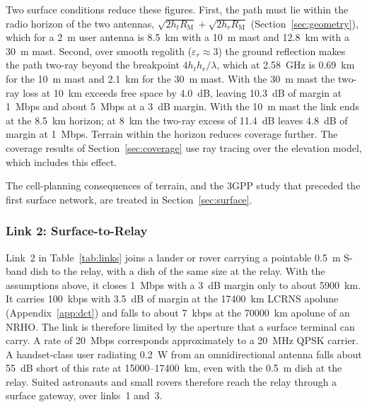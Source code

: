 \documentclass{IEEEoj}
\begin{document}
Two surface conditions reduce these figures. First, the path must lie within the radio horizon of the two antennas, $\sqrt{2h_tR_{\mathrm{M}}}+\sqrt{2h_rR_{\mathrm{M}}}$ (Section~\ref{sec:geometry}), which for a \SI{2}{m} user antenna is \SI{8.5}{km} with a \SI{10}{m} mast and \SI{12.8}{km} with a \SI{30}{m} mast. Second, over smooth regolith ($\varepsilon_r \approx 3$) the ground reflection makes the path two-ray beyond the breakpoint $4h_th_r/\lambda$, which at \SI{2.58}{GHz} is \SI{0.69}{km} for the \SI{10}{m} mast and \SI{2.1}{km} for the \SI{30}{m} mast. With the \SI{30}{m} mast the two-ray loss at \SI{10}{km} exceeds free space by \SI{4.0}{dB}, leaving \SI{10.3}{dB} of margin at \SI{1}{Mbps} and about \SI{5}{Mbps} at a \SI{3}{dB} margin. With the \SI{10}{m} mast the link ends at the \SI{8.5}{km} horizon; at \SI{8}{km} the two-ray excess of \SI{11.4}{dB} leaves \SI{4.8}{dB} of margin at \SI{1}{Mbps}. Terrain within the horizon reduces coverage further. The coverage results of Section~\ref{sec:coverage} use ray tracing over the elevation model, which includes this effect.

The cell-planning consequences of terrain, and the 3GPP study that preceded the first surface network, are treated in Section~\ref{sec:surface}.

\subsubsection{Link 2: Surface-to-Relay}
Link~2 in Table~\ref{tab:links} joins a lander or rover carrying a pointable \SI{0.5}{m} S-band dish to the relay, with a dish of the same size at the relay. With the assumptions above, it closes \SI{1}{Mbps} with a \SI{3}{dB} margin only to about \SI{5900}{km}. It carries \SI{100}{kbps} with \SI{3.5}{dB} of margin at the \SI{17400}{km} LCRNS apolune (Appendix~\ref{app:dct}) and falls to about \SI{7}{kbps} at the \SI{70000}{km} apolune of an NRHO. The link is therefore limited by the aperture that a surface terminal can carry. A rate of \SI{20}{Mbps} corresponds approximately to a \SI{20}{MHz} QPSK carrier. A handset-class user radiating \SI{0.2}{W} from an omnidirectional antenna falls about \SI{55}{dB} short of this rate at \SI{15000}{}--\SI{17400}{km}, even with the \SI{0.5}{m} dish at the relay. Suited astronauts and small rovers therefore reach the relay through a surface gateway, over links~1 and~3.
\end{document}

